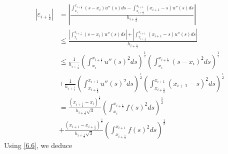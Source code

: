 \documentclass[a4paper]{article}
\numberwithin{equation}{section}
\begin{document}
\begin{align}
\left| {{\varepsilon _{i + \frac{1}{2}}}} \right| &= \left| {\frac{{\int_{{x_i}}^{{x_{i + \frac{1}{2}}}} {\left( {s - {x_i}} \right)u''\left( s \right)ds}  - \int_{{x_{i + \frac{1}{2}}}}^{{x_{i + 1}}} {\left( {{x_{i + 1}} - s} \right)u''\left( s \right)ds} }}{{{h_{i + \frac{1}{2}}}}}} \right|\\
& \le \frac{{\left| {\int_{{x_i}}^{{x_{i + \frac{1}{2}}}} {\left( {s - {x_i}} \right)u''\left( s \right)ds} } \right| + \left| {\int_{{x_{i + \frac{1}{2}}}}^{{x_{i + 1}}} {\left( {{x_{i + 1}} - s} \right)u''\left( s \right)ds} } \right|}}{{{h_{i + \frac{1}{2}}}}}\\
& \le \frac{1}{{{h_{i + \frac{1}{2}}}}}{\left( {\int_{{x_i}}^{{x_{i + \frac{1}{2}}}} {u''{{\left( s \right)}^2}ds} } \right)^{\frac{1}{2}}}{\left( {\int_{{x_i}}^{{x_{i + \frac{1}{2}}}} {{{\left( {s - {x_i}} \right)}^2}ds} } \right)^{\frac{1}{2}}}\\
 &+ \frac{1}{{{h_{i + \frac{1}{2}}}}}{\left( {\int_{{x_{i + \frac{1}{2}}}}^{{x_{i + 1}}} {u''{{\left( s \right)}^2}ds} } \right)^{\frac{1}{2}}}{\left( {\int_{{x_{i + \frac{1}{2}}}}^{{x_{i + 1}}} {{{\left( {{x_{i + 1}} - s} \right)}^2}ds} } \right)^{\frac{1}{2}}}\\
& = \frac{{{{\left( {{x_{i + \frac{1}{2}}} - {x_i}} \right)}^{\frac{3}{2}}}}}{{{h_{i + \frac{1}{2}}}\sqrt 3 }}{\left( {\int_{{x_i}}^{{x_{i + \frac{1}{2}}}} {f{{\left( s \right)}^2}ds} } \right)^{\frac{1}{2}}} \\
&+ \frac{{{{\left( {{x_{i + 1}} - {x_{i + \frac{1}{2}}}} \right)}^{\frac{3}{2}}}}}{{{h_{i + \frac{1}{2}}}\sqrt 3 }}{\left( {\int_{{x_{i + \frac{1}{2}}}}^{{x_{i + 1}}} {f{{\left( s \right)}^2}ds} } \right)^{\frac{1}{2}}}
\end{align}
Using \eqref{6.6}, we deduce 
\end{document}

